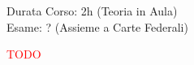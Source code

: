 \documentclass[../uefaC.tex]{subfiles}
\begin{document}

Durata Corso: 2h (Teoria in Aula) \hfill \\
Esame: ? (Assieme a Carte Federali)

\textcolor{red}{TODO}
\end{document}
